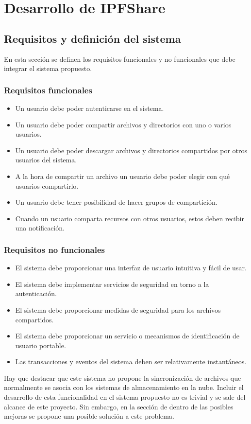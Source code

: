 \chapter{Desarrollo de IPFShare}\label{chap:4desarrollo}

\section{Requisitos y definición del sistema}
En esta sección se definen los requisitos funcionales y no funcionales que debe integrar el sistema propuesto.
\subsection{Requisitos funcionales}
\begin{itemize}[noitemsep,after=\vspace{-0.6\baselineskip}]
  \item Un usuario debe poder autenticarse en el sistema.
  \item Un usuario debe poder compartir archivos y directorios con uno o varios usuarios.
  \item Un usuario debe poder descargar archivos y directorios compartidos por otros usuarios del sistema.
  \item A la hora de compartir un archivo un usuario debe poder elegir con qué usuarios compartirlo.
  \item Un usuario debe tener posibilidad de hacer grupos de compartición.
  \item Cuando un usuario comparta recursos con otros usuarios, estos deben recibir una notificación.
\end{itemize}
\subsection{Requisitos no funcionales}
\begin{itemize}[noitemsep,after=\vspace{-0.4\baselineskip}]
  \item El sistema debe proporcionar una interfaz de usuario intuitiva y fácil de usar.
  \item El sistema debe implementar servicios de seguridad en torno a la autenticación.
  \item El sistema debe proporcionar medidas de seguridad para los archivos compartidos.
  \item El sistema debe proporcionar un servicio o mecanismos de identificación de usuario portable.
  \item Las transacciones y eventos del sistema deben ser relativamente instantáneos.
\end{itemize}
Hay que destacar que este sistema no propone la sincronización de archivos que normalmente se asocia con los sistemas de
almacenamiento en la nube. Incluir el desarrollo de esta funcionalidad en el sistema propuesto no es trivial y se sale
del alcance de este proyecto. Sin embargo, en la sección de  dentro de las posibles
mejoras se propone una posible solución a este problema.
